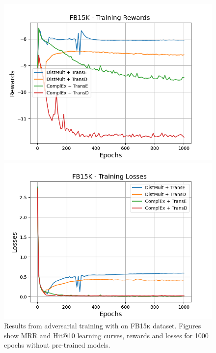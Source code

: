 \begin{figure}[H]
    \begin{minipage}{.45\textwidth}
      \centering
      \includegraphics[width=0.9\linewidth]{figures/results/gan_train/not_pretrained/uncertainty/max/entropy/fb15k/1k_epochs/uncertainty_fb15k_rew.png}
    \end{minipage}%
     \begin{minipage}{.45\textwidth}
      \centering
      \includegraphics[width=0.9\linewidth]{figures/results/gan_train/not_pretrained/uncertainty/max/entropy/fb15k/1k_epochs/uncertainty_fb15k_losses.png}
    \end{minipage}%
    \caption{Results from adversarial training with \usmax on \textsc{FB15k} dataset.
    Figures show MRR and Hit@10 learning curves, rewards and losses for 1000 epochs without pre-trained models.}
    \label{fig:gan_train_not_pretrained_usmax_fb15k}
\end{figure}
